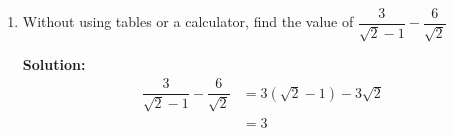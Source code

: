 \documentclass{report}
\newcommand{\sol}{\vspace{0.2cm}\textbf{Solution:}\vspace{0.2cm}}
\begin{document}
\begin{multicols*}{2}
\begin{enumerate}[leftmargin=*]
\begin{enumerate}
                        \sol{}
                        \begin{align*}
                            \dfrac{125^x}{25^y}    & = 625            \\
                            \dfrac{5^{3x}}{5^{2y}} & = 5^4            \\
                            5^{3x-2y}              & = 5^4            \\
                            3x - 2y                & = 4\ \cdots\ (1)
                        \end{align*}
                        \begin{align*}
                            2 \cdot 4^x    & = 32^y            \\
                            2 \cdot 2^{2x} & = 2^{5y}          \\
                            2x + 1         & = 5y              \\
                            2x - 5y        & = -1\ \cdots\ (2)
                        \end{align*}
                        Multiplying $(1)$ by $2$,
                        \begin{align*}
                            6x - 4y & = 8\ \cdots\ (3)
                        \end{align*}
                        Multiplying $(2)$ by $3$,
                        \begin{align*}
                            6x - 15y & = -3\ \cdots\ (4)
                        \end{align*}
                        Subtracting $(4)$ from $(3)$,
                        \begin{align*}
                            11y & = 11 \\
                            y   & = 1
                        \end{align*}
                        Substituting $y=1$ into $(1)$,
                        \begin{align*}
                            3x - 2 & = 4 \\
                            x      & = 2
                        \end{align*}

                  \item Without using tables or a calculator, find the value of
                        $\dfrac{3}{\sqrt{2}-1}-\dfrac{6}{\sqrt{2}}$

                        \sol{}
                        \begin{align*}
                            \dfrac{3}{\sqrt{2}-1} - \dfrac{6}{\sqrt{2}} & = 3(\sqrt{2} - 1) - 3\sqrt{2} \\
                                                                        & = 3
                        \end{align*}
              \end{enumerate}


\end{enumerate}
\end{multicols*}
\end{document}
